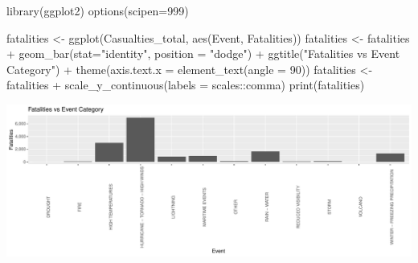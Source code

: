 \documentclass[
]{article}
\newenvironment{Shaded}{\begin{snugshade}}{\end{snugshade}}
\newcommand{\AttributeTok}[1]{\textcolor[rgb]{0.77,0.63,0.00}{#1}}
\newcommand{\DecValTok}[1]{\textcolor[rgb]{0.00,0.00,0.81}{#1}}
\newcommand{\FunctionTok}[1]{\textcolor[rgb]{0.00,0.00,0.00}{#1}}
\newcommand{\NormalTok}[1]{#1}
\newcommand{\OtherTok}[1]{\textcolor[rgb]{0.56,0.35,0.01}{#1}}
\newcommand{\SpecialCharTok}[1]{\textcolor[rgb]{0.00,0.00,0.00}{#1}}
\newcommand{\StringTok}[1]{\textcolor[rgb]{0.31,0.60,0.02}{#1}}
\begin{document}
\begin{Shaded}
\begin{Highlighting}[]
\FunctionTok{library}\NormalTok{(ggplot2)}
\FunctionTok{options}\NormalTok{(}\AttributeTok{scipen=}\DecValTok{999}\NormalTok{)}

\NormalTok{fatalities }\OtherTok{\textless{}{-}} \FunctionTok{ggplot}\NormalTok{(Casualties\_total, }\FunctionTok{aes}\NormalTok{(Event, Fatalities))}
\NormalTok{fatalities }\OtherTok{\textless{}{-}}\NormalTok{ fatalities }\SpecialCharTok{+} \FunctionTok{geom\_bar}\NormalTok{(}\AttributeTok{stat=}\StringTok{"identity"}\NormalTok{, }\AttributeTok{position =} \StringTok{"dodge"}\NormalTok{) }\SpecialCharTok{+} \FunctionTok{ggtitle}\NormalTok{(}\StringTok{"Fatalities vs Event Category"}\NormalTok{) }\SpecialCharTok{+} \FunctionTok{theme}\NormalTok{(}\AttributeTok{axis.text.x =} \FunctionTok{element\_text}\NormalTok{(}\AttributeTok{angle =} \DecValTok{90}\NormalTok{))}
\NormalTok{fatalities }\OtherTok{\textless{}{-}}\NormalTok{ fatalities }\SpecialCharTok{+} \FunctionTok{scale\_y\_continuous}\NormalTok{(}\AttributeTok{labels =}\NormalTok{ scales}\SpecialCharTok{::}\NormalTok{comma)}
\FunctionTok{print}\NormalTok{(fatalities)}
\end{Highlighting}
\end{Shaded}

\includegraphics{RepData_PeerAssessment2_files/figure-latex/Fatalities Results-1.pdf}
\end{document}
